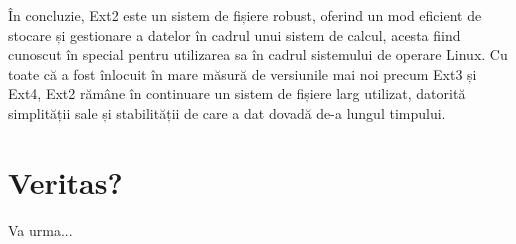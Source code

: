 În concluzie, Ext2 este un sistem de fișiere robust, oferind un mod eficient de stocare și gestionare a datelor în cadrul unui sistem de calcul, acesta fiind cunoscut în special pentru utilizarea sa în cadrul sistemului de operare Linux. Cu toate că a fost înlocuit în mare măsură de versiunile mai noi precum Ext3 și Ext4, Ext2 rămâne în continuare un sistem de fișiere larg utilizat, datorită simplității sale și stabilității de care a dat dovadă de-a lungul timpului.



























\newpage

\section{Veritas?}

Va urma...